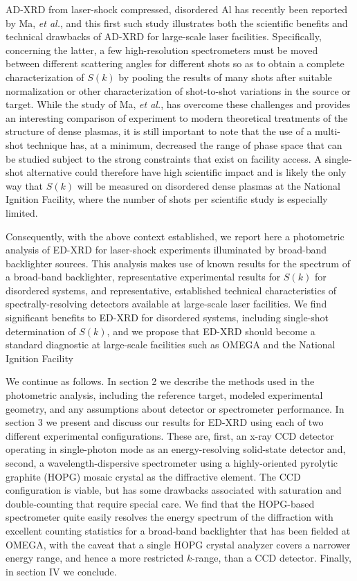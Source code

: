 AD-XRD from laser-shock compressed, disordered Al has recently been
reported by Ma, \emph{et
al.}, \cite{ma2013x}
and this first such study illustrates both the scientific benefits and
technical drawbacks of AD-XRD for large-scale laser facilities.
Specifically, concerning the latter, a few high-resolution spectrometers
must be moved between different scattering angles for different shots so
as to obtain a complete characterization of \(S(k)\) by pooling the
results of many shots after suitable normalization or other
characterization of shot-to-shot variations in the source or target.
While the study of Ma, \emph{et
al.}, \cite{ma2013x}
has overcome these challenges and provides an interesting comparison of
experiment to modern theoretical treatments of the structure of dense
plasmas, it is still important to note that the use of a multi-shot
technique has, at a minimum, decreased the range of phase space that can
be studied subject to the strong constraints that exist on facility
access. A single-shot alternative could therefore have high scientific
impact and is likely the only way that \(S(k)\) will be measured on
disordered dense plasmas at the National Ignition Facility, where the
number of shots per scientific study is especially limited.

Consequently, with the above context established, we report here a
photometric analysis of ED-XRD for laser-shock experiments illuminated
by broad-band backlighter sources. This analysis makes use of known
results for the spectrum of a broad-band backlighter, representative
experimental results for \(S(k)\) for disordered systems, and
representative, established technical characteristics of
spectrally-resolving detectors available at large-scale laser
facilities. We find significant benefits to ED-XRD for disordered
systems, including single-shot determination of \(S(k)\), and we propose
that ED-XRD should become a standard diagnostic at large-scale
facilities such as OMEGA and the National Ignition Facility

We continue as follows. In section 2 we describe the methods used in the
photometric analysis, including the reference target, modeled
experimental geometry, and any assumptions about detector or
spectrometer performance. In section 3 we present and discuss our
results for ED-XRD using each of two different experimental
configurations. These are, first, an x-ray CCD detector operating in
single-photon mode as an energy-resolving solid-state detector and,
second, a wavelength-dispersive spectrometer using a highly-oriented
pyrolytic graphite (HOPG) mosaic crystal as the diffractive element. The
CCD configuration is viable, but has some drawbacks associated with
saturation and double-counting that require special care. We find that
the HOPG-based spectrometer quite easily resolves the energy spectrum of
the diffraction with excellent counting statistics for a broad-band
backlighter that has been fielded at OMEGA, with the caveat that a
single HOPG crystal analyzer covers a narrower energy range, and hence a
more restricted \(k\)-range, than a CCD detector. Finally, in section IV
we conclude.

